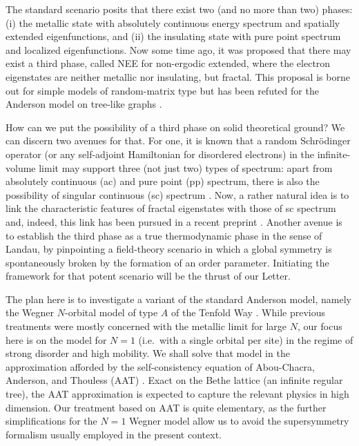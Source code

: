 \documentclass[aps,prl,twocolumn,letterpaper,superscriptaddress]{revtex4-2}
\begin{document}
The standard scenario posits that there exist two (and no more than two) phases: (i) the metallic state with absolutely continuous energy spectrum and spatially extended eigenfunctions, and (ii) the insulating state with pure point spectrum and localized eigenfunctions. Now some time ago, it was proposed \cite{AGKL1997, KAI2018} that there may exist a third phase, called NEE for non-ergodic extended, where the electron eigenstates are neither metallic nor insulating, but fractal. This proposal is borne out for simple models of random-matrix type \cite{KKCA2015} but has been refuted for the Anderson model on tree-like graphs \cite{TMS2016, BHT2022, Lemarie2022, SLS2022}.

How can we put the possibility of a third phase on solid theoretical ground? We can discern two avenues for that. For one, it is known that a random Schr\"odinger operator (or any self-adjoint Hamiltonian for disordered electrons) in the infinite-volume limit may support three (not just two) types of spectrum: apart from absolutely continuous (ac) and pure point (pp) spectrum, there is also the possibility of singular continuous (sc) spectrum \cite{ReedSimon, DJMS94}. Now, a rather natural idea is to link the characteristic features of fractal eigenstates with those of sc spectrum and, indeed, this link has been pursued in a recent preprint \cite{AK2023}. Another avenue is to establish the third phase as a true thermodynamic phase in the sense of Landau, by pinpointing a field-theory scenario in which a global symmetry is spontaneously broken by the formation of an order parameter. Initiating the framework for that potent scenario will be the thrust of our Letter.

The plan here is to investigate a variant of the standard Anderson model, namely the Wegner $N$-orbital model \cite{Weg79b} of type $A$ of the Tenfold Way \cite{HHZ}. While previous treatments were mostly concerned with the metallic limit for large $N$, our focus here is on the model for $N = 1$ (i.e.\ with a single orbital per site) in the regime of strong disorder and high mobility. We shall solve that model in the approximation afforded by the self-consistency equation of Abou-Chacra, Anderson, and Thouless (AAT) \cite{AAT1973}. Exact on the Bethe lattice (an infinite regular tree), the AAT approximation is expected to capture the relevant physics in high dimension. Our treatment based on AAT is quite elementary, as the further simplifications for the $N=1$ Wegner model allow us to avoid the supersymmetry formalism usually employed in the present context.
\end{document}
